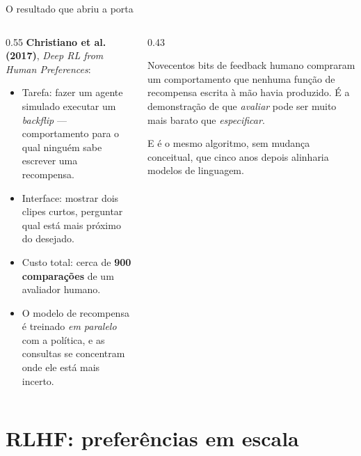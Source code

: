 \documentclass[aspectratio=169, 11pt]{beamer}
\begin{document}
\begin{frame}{O resultado que abriu a porta}

  \begin{columns}[T]
  \begin{column}{0.55\textwidth}
    \textbf{Christiano et al. (2017)}, \emph{Deep RL from Human Preferences}:
    \begin{itemize}\setlength{\itemsep}{0.3ex}
      \item Tarefa: fazer um agente simulado executar um \emph{backflip} ---
        comportamento para o qual ninguém sabe escrever uma recompensa.
      \item Interface: mostrar dois clipes curtos, perguntar qual está mais
        próximo do desejado.
      \item Custo total: cerca de \textbf{900 comparações} de um avaliador
        humano.
      \item O modelo de recompensa é treinado \emph{em paralelo} com a política,
        e as consultas se concentram onde ele está mais incerto.
    \end{itemize}
  \end{column}
  \begin{column}{0.43\textwidth}
    \begin{ideiabox}
      Novecentos bits de feedback humano compraram um comportamento que nenhuma
      função de recompensa escrita à mão havia produzido. É a demonstração de
      que \emph{avaliar} pode ser muito mais barato que \emph{especificar}.
    \end{ideiabox}
    \begin{alertabox}
      E é o mesmo algoritmo, sem mudança conceitual, que cinco anos depois
      alinharia modelos de linguagem.
    \end{alertabox}
  \end{column}
  \end{columns}
\end{frame}

\section{RLHF: preferências em escala}
\end{document}

